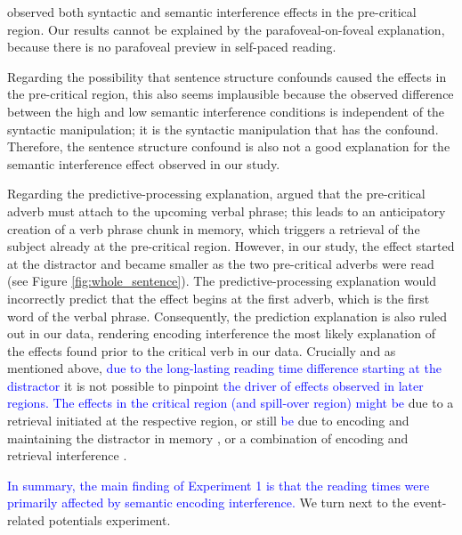 \documentclass[review,preprint,12pt,authoryear,floatsintext]{elsarticle}
\begin{document}
\cite{mertzen} observed both syntactic and semantic interference effects in the pre-critical region. {}\label{confound} Our results cannot be explained by the parafoveal-on-foveal explanation, because there is no parafoveal preview in self-paced reading. 

Regarding the possibility that sentence structure confounds caused the effects in the pre-critical region, this also seems implausible because the observed difference between the high and low semantic interference conditions is independent of the syntactic manipulation; it is the syntactic manipulation that has the confound. Therefore, the sentence structure confound is also not a good explanation for the semantic interference effect observed in our study. 

Regarding the predictive-processing explanation, \citet{mertzen} argued that the pre-critical adverb must attach to the upcoming verbal phrase; this leads to an anticipatory creation of a verb phrase chunk in memory, which triggers a retrieval of the subject already at the pre-critical region. However, in our study, the effect started at the distractor and became smaller as the two pre-critical adverbs were read (see Figure \ref{fig:whole_sentence}). The predictive-processing explanation would incorrectly predict that the effect begins at the first adverb, which is the first word of the verbal phrase. Consequently, the prediction explanation is also ruled out in our data, rendering encoding interference the most likely explanation of the effects found prior to the critical verb in our data. Crucially and as mentioned above, \textcolor{blue}{due to the long-lasting reading time difference starting at the distractor} it is not possible to pinpoint \textcolor{blue}{the driver of effects observed in later regions. The effects in the critical region (and spill-over region) might be} due to a retrieval initiated at the respective region, or still \textcolor{blue}{be} due to encoding and maintaining the distractor in memory \citep{ness2017}, or a combination of encoding and retrieval interference \citep{Yadavetal2022}.

\textcolor{blue}{In summary, the main finding of Experiment 1 is that the reading times were primarily affected by semantic encoding interference.} We turn next to the event-related potentials experiment.
\end{document}
